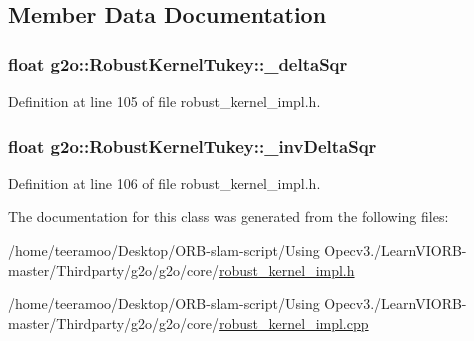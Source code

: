 \subsection{Member Data Documentation}
\subsubsection[{\texorpdfstring{\+\_\+delta\+Sqr}{_deltaSqr}}]{\setlength{\rightskip}{0pt plus 5cm}float g2o\+::\+Robust\+Kernel\+Tukey\+::\+\_\+delta\+Sqr\hspace{0.3cm}{\ttfamily [private]}}\hypertarget{classg2o_1_1RobustKernelTukey_a3964d90966fa04e5d8002c1c52bda718}{}\label{classg2o_1_1RobustKernelTukey_a3964d90966fa04e5d8002c1c52bda718}


Definition at line 105 of file robust\+\_\+kernel\+\_\+impl.\+h.

\subsubsection[{\texorpdfstring{\+\_\+inv\+Delta\+Sqr}{_invDeltaSqr}}]{\setlength{\rightskip}{0pt plus 5cm}float g2o\+::\+Robust\+Kernel\+Tukey\+::\+\_\+inv\+Delta\+Sqr\hspace{0.3cm}{\ttfamily [private]}}\hypertarget{classg2o_1_1RobustKernelTukey_addca0bfe5d4cafbe0a030c645efd2754}{}\label{classg2o_1_1RobustKernelTukey_addca0bfe5d4cafbe0a030c645efd2754}


Definition at line 106 of file robust\+\_\+kernel\+\_\+impl.\+h.



The documentation for this class was generated from the following files\+:\begin{DoxyCompactItemize}
\item 
/home/teeramoo/\+Desktop/\+O\+R\+B-\/slam-\/script/\+Using Opecv3./\+Learn\+V\+I\+O\+R\+B-\/master/\+Thirdparty/g2o/g2o/core/\hyperlink{robust__kernel__impl_8h}{robust\+\_\+kernel\+\_\+impl.\+h}\item 
/home/teeramoo/\+Desktop/\+O\+R\+B-\/slam-\/script/\+Using Opecv3./\+Learn\+V\+I\+O\+R\+B-\/master/\+Thirdparty/g2o/g2o/core/\hyperlink{robust__kernel__impl_8cpp}{robust\+\_\+kernel\+\_\+impl.\+cpp}\end{DoxyCompactItemize}
